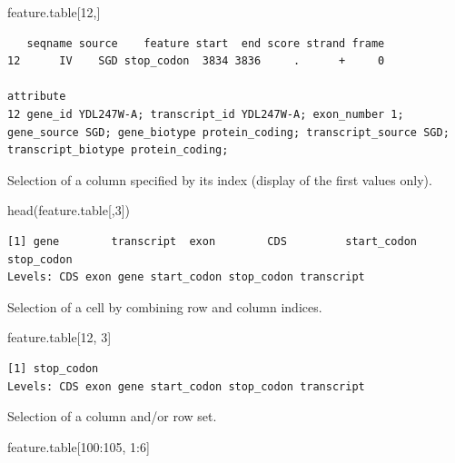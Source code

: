 \documentclass[]{article}
\newenvironment{Shaded}{\begin{snugshade}}{\end{snugshade}}
\newcommand{\KeywordTok}[1]{\textcolor[rgb]{0.94,0.87,0.69}{#1}}
\newcommand{\DecValTok}[1]{\textcolor[rgb]{0.86,0.86,0.80}{#1}}
\newcommand{\OperatorTok}[1]{\textcolor[rgb]{0.94,0.94,0.82}{#1}}
\newcommand{\NormalTok}[1]{\textcolor[rgb]{0.80,0.80,0.80}{#1}}
\begin{document}
\begin{Shaded}
\begin{Highlighting}[]
\NormalTok{feature.table[}\DecValTok{12}\NormalTok{,]}
\end{Highlighting}
\end{Shaded}

\begin{verbatim}
   seqname source    feature start  end score strand frame
12      IV    SGD stop_codon  3834 3836     .      +     0
                                                                                                                                                            attribute
12 gene_id YDL247W-A; transcript_id YDL247W-A; exon_number 1; gene_source SGD; gene_biotype protein_coding; transcript_source SGD; transcript_biotype protein_coding;
\end{verbatim}

Selection of a column specified by its index (display of the first
values only).

\begin{Shaded}
\begin{Highlighting}[]
\KeywordTok{head}\NormalTok{(feature.table[,}\DecValTok{3}\NormalTok{])}
\end{Highlighting}
\end{Shaded}

\begin{verbatim}
[1] gene        transcript  exon        CDS         start_codon stop_codon 
Levels: CDS exon gene start_codon stop_codon transcript
\end{verbatim}

Selection of a cell by combining row and column indices.

\begin{Shaded}
\begin{Highlighting}[]
\NormalTok{feature.table[}\DecValTok{12}\NormalTok{, }\DecValTok{3}\NormalTok{]}
\end{Highlighting}
\end{Shaded}

\begin{verbatim}
[1] stop_codon
Levels: CDS exon gene start_codon stop_codon transcript
\end{verbatim}

Selection of a column and/or row set.

\begin{Shaded}
\begin{Highlighting}[]
\NormalTok{feature.table[}\DecValTok{100}\OperatorTok{:}\DecValTok{105}\NormalTok{, }\DecValTok{1}\OperatorTok{:}\DecValTok{6}\NormalTok{]}
\end{Highlighting}
\end{Shaded}
\end{document}
